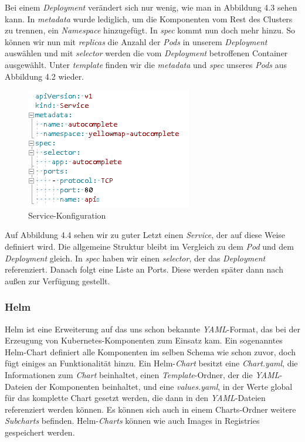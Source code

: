 \documentclass[12pt,a4paper]{scrartcl}
\begin{document}
Bei einem \emph{Deployment} verändert sich nur wenig, wie man in Abbildung 4.3 sehen kann. In \emph{metadata} wurde lediglich, um die Komponenten vom Rest des Clusters zu trennen, ein \emph{Namespace} hinzugefügt. In \emph{spec} kommt nun doch mehr hinzu. So können wir nun mit \emph{replicas} die Anzahl der \emph{Pods} in unserem \emph{Deployment} auswählen und mit \emph{selector} werden die vom \emph{Deployment} betroffenen Container ausgewählt. Unter \emph{template} finden wir die \emph{metadata} und \emph{spec} unseres \emph{Pods} aus Abbildung 4.2 wieder.

\begin{figure}[h!]
	\centering
	\includegraphics[scale=1]{KubeYmlSvc.png}
	\caption[Service-Konfiguration]{Service-Konfiguration}
\end{figure}

Auf Abbildung 4.4 sehen wir zu guter Letzt einen \emph{Service}, der auf diese Weise definiert wird. Die allgemeine Struktur bleibt im Vergleich zu dem \emph{Pod} und dem \emph{Deployment} gleich. In \emph{spec} haben wir einen \emph{selector}, der das \emph{Deployment} referenziert. Danach folgt eine Liste an Ports. Diese werden später dann nach außen zur Verfügung gestellt.

\subsubsection{Helm}

Helm\cite{hlmWeb} ist eine Erweiterung auf das uns schon bekannte \emph{YAML}-Format, das bei der Erzeugung von Kubernetes-Komponenten zum Einsatz kam. Ein sogenanntes Helm-Chart definiert alle Komponenten im selben Schema wie schon zuvor, doch fügt einiges an Funktionalität hinzu. Ein Helm-\emph{Chart} besitzt eine \emph{Chart.yaml}, die Informationen zum \emph{Chart} beinhaltet, einen \emph{Template}-Ordner, der die \emph{YAML}-Dateien der Komponenten beinhaltet, und eine \emph{values.yaml}, in der Werte global für das komplette Chart gesetzt werden, die dann in den \emph{YAML}-Dateien referenziert werden können. Es können sich auch in einem Charts-Ordner weitere \emph{Subcharts} befinden. Helm-\emph{Charts} können wie auch Images in Registries gespeichert werden.\cite{hlmDoc}
\end{document}
